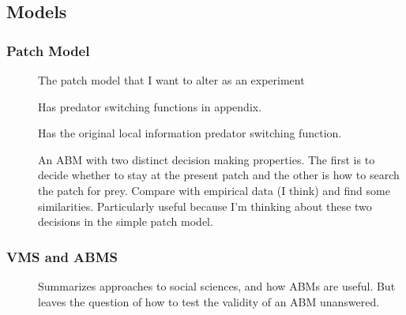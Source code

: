 \documentclass[a4paper,10pt]{report}
\begin{document}
\subsection{Models}
\subsubsection{Patch Model}
\begin{description}
\item[\cite{Abramsetal:2012}] The patch model that I want to alter as an experiment
\item[\cite{Abramsetal:2011}] Has predator switching functions in appendix. 
\item[\cite{Ives:1992}] Has the original local information predator switching function. 
\item[\cite{DreyfusLeon:1999}] An ABM with two distinct decision making properties. The first is to decide whether to stay at the present patch and the other is how to search the patch for prey. Compare with empirical data (I think) and find some similarities. Particularly useful because I'm thinking about these two decisions in the simple patch model. 
\end{description}


\subsubsection{VMS and ABMS}
\begin{description}
\item[\cite{JanssenOstrom:2006}] Summarizes approaches to social sciences, and how ABMs are useful. But leaves the question of how to test the validity of an ABM unanswered. 
\end{description}



\end{document}
